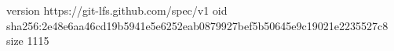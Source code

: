 version https://git-lfs.github.com/spec/v1
oid sha256:2e48e6aa46cd19b5941e5e6252eab0879927bef5b50645e9c19021e2235527c8
size 1115
